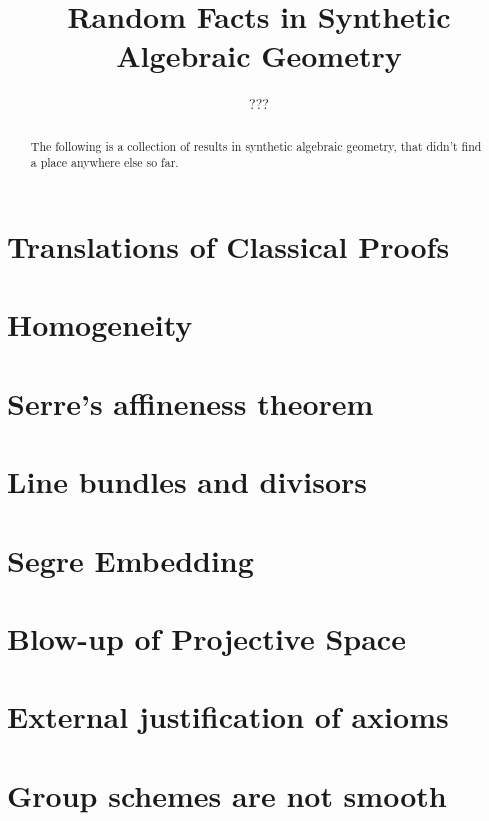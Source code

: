 \documentclass{../util/zariski}
\title{Random Facts in Synthetic Algebraic Geometry}
\author{???}
\begin{document}
\maketitle

\begin{abstract}
  The following is a collection of results in synthetic algebraic geometry,
  that didn't find a place anywhere else so far.
\end{abstract}

\tableofcontents

\section{Translations of Classical Proofs}


\section{Homogeneity}


\section{Serre's affineness theorem}


\section{Line bundles and divisors}


\section{Segre Embedding}


\section{Blow-up of Projective Space}


\section{External justification of axioms}


\section{Group schemes are not smooth}

\end{document}
